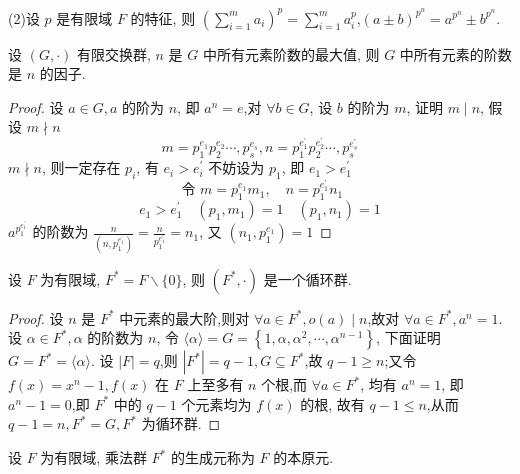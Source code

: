 (2)设 $ p $ 是有限域 $ F $ 的特征, 则 $ \left(\sum\limits_{i=1}^{m} a_{i}\right)^{p}=\sum\limits_{i=1}^{m} a_{i}^{p} $,$(a \pm b)^{p^{n}}=a^{p^{n}} \pm b^{p^{n}} .$

\begin{lemma}
    设 $ (G, \cdot) $ 有限交换群, $ n $ 是 $ G $ 中所有元素阶数的最大值, 则 $ G $ 中所有元素的阶数是 $ n $ 的因子.
\end{lemma}
\begin{proof}
    设 $ a \in G, a $ 的阶为 $ n $, 即 $ a^{n}=e $,对 $ \forall b \in G $, 设 $ b $ 的阶为 $ m $, 证明 $ m \mid n $, 假设 $ m \nmid n $
$$
m=p_{1}^{e_{1}} p_{2}^{e_{2}} \cdots, p_{s}^{e_{s}}, n=p_{1}^{e_{1}^{\prime}} p_{2}^{e_{2}^{\prime}} \cdots, p_{s}^{e_{s}^{\prime}}
$$
$ m \nmid n $, 则一定存在 $ p_{i} $, 有 $ e_{i}>e_{i}^{\prime} $
不妨设为 $ p_{1} $, 即 $ e_{1}>e_{1}^{\prime} $
$$
\text { 令 } m=p_{1}^{e_{1}} m_{1}, \quad n=p_{1}^{e_{1}^{\prime}} n_{1}
$$
$$
e_{1}>e_{1}^{\prime} \quad\left(p_{1}, m_{1}\right)=1 \quad\left(p_{1}, n_{1}\right)=1
$$
$ a^{p_{1}^{e_{1}^{\prime}}} $ 的阶数为 $ \frac{n}{\left(n, p_{1}^{e_{1}^{\prime}}\right)}=\frac{n}{p_{1}^{e_{1}^{\prime}}}=n_{1} $, 又 $ \left(n_{1}, p_{1}^{e_{1}}\right)=1 $
\end{proof}

\begin{theorem}
    设 $ F $ 为有限域, $ F^{*}=F \backslash\{0\} $, 则 $ \left(F^{*}, \cdot\right) $ 是一个循环群.
\end{theorem}
\begin{proof}
设 $ n $ 是 $ F^{*} $ 中元素的最大阶,则对 $ \forall a \in F^{*}, o(a) \mid n $,故对 $ \forall a \in F^{*}, a^{n}=1 $.
设 $ \alpha \in F^{*}, \alpha $ 的阶数为 $ n $, 令 $ \langle\alpha\rangle=G=\left\{1, \alpha, \alpha^{2}, \cdots, \alpha^{n-1}\right\} $, 下面证明 $ G=F^{*}=\langle\alpha\rangle $. 设 $ |F|=q $,则 $ \left|F^{*}\right|=q-1, G \subseteq F^{*} $,故 $ q-1 \geqslant n $;又令 $ f(x)=x^{n}-1, f(x) $ 在 $ F $ 上至多有 $ n $ 个根,而 $ \forall a \in F^{*} $, 均有 $ a^{n}=1 $, 即 $ a^{n}-1=0 $,即 $ F^{*} $ 中的 $ q-1 $ 个元素均为 $ f(x) $ 的根, 故有 $ q-1 \leqslant n $,从而 $ q-1=n, F^{*}=G, F^{*} $ 为循环群.
\end{proof}

\begin{definition}
    设 $ F $ 为有限域, 乘法群 $ F^{*} $ 的生成元称为 $ F $ 的本原元.
\end{definition}


